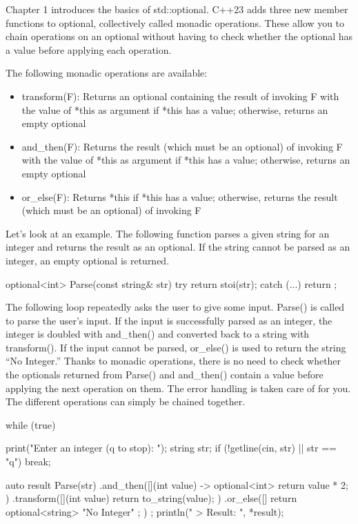 

Chapter 1 introduces the basics of std::optional. C++23 adds three new member functions to optional, collectively called monadic operations. These allow you to chain operations on an optional without having to check whether the optional has a value before applying each operation.

The following monadic operations are available:

\begin{itemize}
\item
transform(F): Returns an optional containing the result of invoking F with the value of *this as argument if *this has a value; otherwise, returns an empty optional

\item
and\_then(F): Returns the result (which must be an optional) of invoking F with the value of *this as argument if *this has a value; otherwise, returns an empty optional

\item
or\_else(F): Returns *this if *this has a value; otherwise, returns the result (which must be an optional) of invoking F
\end{itemize}

Let’s look at an example. The following function parses a given string for an integer and returns the result as an optional. If the string cannot be parsed as an integer, an empty optional is returned.

\begin{cpp}
optional<int> Parse(const string& str)
{
    try { return stoi(str); }
    catch (...) { return {}; }
}
\end{cpp}

The following loop repeatedly asks the user to give some input. Parse() is called to parse the user’s input. If the input is successfully parsed as an integer, the integer is doubled with and\_then() and converted back to a string with transform(). If the input cannot be parsed, or\_else() is used to return the string “No Integer.” Thanks to monadic operations, there is no need to check whether the optionals returned from Parse() and and\_then() contain a value before applying the next operation on them. The error handling is taken care of for you. The different operations can simply be chained together.

\begin{cpp}
while (true) {
    print("Enter an integer (q to stop): ");
    string str;
    if (!getline(cin, str) || str == "q") { break; }

    auto result { Parse(str)
        .and_then([](int value) -> optional<int> { return value * 2; })
        .transform([](int value) { return to_string(value); })
        .or_else([] { return optional<string> { "No Integer" }; }) };
    println(" > Result: {}", *result);
}
\end{cpp}

